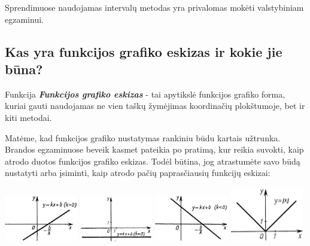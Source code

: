 \documentclass{article}
\begin{document}
Sprendimuose naudojamas intervalų metodas yra privalomas mokėti valstybiniam egzaminui.
\subsection*{Kas yra funkcijos grafiko eskizas ir kokie jie būna?}
\begin{mybox}{Funkcija}
\textbf{\textit{Funkcijos grafiko eskizas}} - tai apytikslė funkcijos grafiko forma, kuriai gauti naudojamas ne vien taškų žymėjimas koordinačių plokštumoje, bet ir kiti metodai.
\end{mybox}
Matėme, kad funkcijos grafiko nustatymas rankiniu būdu kartais užtrunka. Brandos egzaminuose beveik kasmet pateikia po pratimą, kur reikia suvokti, kaip atrodo duotos funkcijos grafiko eskizas. Todėl būtina, jog atrastumėte savo būdą nustatyti arba įsiminti, kaip atrodo pačių paprasčiausių funkcijų eskizai:

\includegraphics[width=0.24\textwidth]{graph_line.png}
\includegraphics[width=0.24\textwidth]{graph_hline.png}
\includegraphics[width=0.24\textwidth]{graph_downline.png}
\includegraphics[width=0.24\textwidth]{graph_abs.png}
\end{document}
